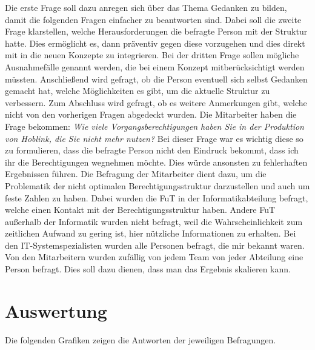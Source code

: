 Die erste Frage soll dazu anregen sich über das Thema Gedanken zu bilden, damit die folgenden Fragen einfacher zu beantworten sind.
Dabei soll die zweite Frage klarstellen, welche Herausforderungen die befragte Person mit der Struktur hatte.
Dies ermöglicht es, dann präventiv gegen diese vorzugehen und dies direkt mit in die neuen Konzepte zu integrieren.
Bei der dritten Frage sollen mögliche Ausnahmefälle genannt werden, die bei einem Konzept mitberücksichtigt werden müssten.
Anschließend wird gefragt, ob die Person eventuell sich selbst Gedanken gemacht hat, welche Möglichkeiten es gibt, um die aktuelle Struktur zu verbessern.
Zum Abschluss wird gefragt, ob es weitere Anmerkungen gibt, welche nicht von den vorherigen Fragen abgedeckt wurden.
\newline
\newline
Die Mitarbeiter haben die Frage bekommen:
\newline
\newline
\textit{Wie viele Vorgangsberechtigungen haben Sie in der Produktion von Hoblink, die Sie nicht mehr nutzen?}
\newline
\newline
Bei dieser Frage war es wichtig diese so zu formulieren, dass die befragte Person nicht den Eindruck bekommt, dass ich ihr die Berechtigungen wegnehmen möchte.
Dies würde ansonsten zu fehlerhaften Ergebnissen führen.
Die Befragung der Mitarbeiter dient dazu, um die Problematik der nicht optimalen Berechtigungsstruktur darzustellen und auch um feste Zahlen zu haben.
\newline
\newline
Dabei wurden die \ac{FuT} in der Informatikabteilung befragt, welche einen Kontakt mit der Berechtigungsstruktur haben.
Andere \ac{FuT} außerhalb der Informatik wurden nicht befragt, weil die Wahrscheinlichkeit zum zeitlichen Aufwand zu gering ist, hier nützliche Informationen zu erhalten.
Bei den IT-Systemspezialisten wurden alle Personen befragt, die mir bekannt waren.
Von den Mitarbeitern wurden zufällig von jedem Team von jeder Abteilung eine Person befragt.
Dies soll dazu dienen, dass man das Ergebnis skalieren kann.
\newpage
\section{Auswertung}
\label{sec:Auswertung}

Die folgenden Grafiken zeigen die Antworten der jeweiligen Befragungen.

